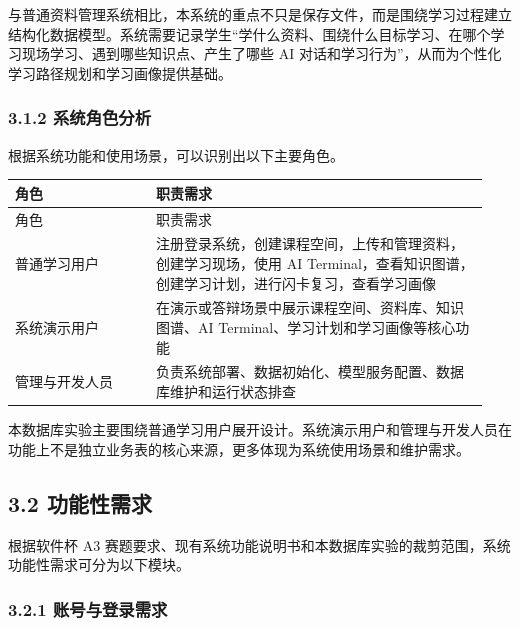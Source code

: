 \documentclass[10pt,a4paper,fontset=none]{ctexart}
\begin{document}
与普通资料管理系统相比，本系统的重点不只是保存文件，而是围绕学习过程建立结构化数据模型。系统需要记录学生“学什么资料、围绕什么目标学习、在哪个学习现场学习、遇到哪些知识点、产生了哪些 AI 对话和学习行为”，从而为个性化学习路径规划和学习画像提供基础。\par

\subsubsection*{3.1.2 系统角色分析}

根据系统功能和使用场景，可以识别出以下主要角色。\par

\begingroup\scriptsize
\renewcommand{\arraystretch}{1.18}
\setlength{\LTleft}{0pt}
\setlength{\LTright}{0pt}
\begin{longtable}{>{\raggedright\arraybackslash}p{0.28\linewidth}>{\raggedright\arraybackslash}p{0.66\linewidth}}
\toprule
角色 & 职责需求 \\
\midrule
\endfirsthead
\toprule
角色 & 职责需求 \\
\midrule
\endhead
普通学习用户 & 注册登录系统，创建课程空间，上传和管理资料，创建学习现场，使用 AI Terminal，查看知识图谱，创建学习计划，进行闪卡复习，查看学习画像 \\
系统演示用户 & 在演示或答辩场景中展示课程空间、资料库、知识图谱、AI Terminal、学习计划和学习画像等核心功能 \\
管理与开发人员 & 负责系统部署、数据初始化、模型服务配置、数据库维护和运行状态排查 \\
\bottomrule
\end{longtable}
\endgroup


本数据库实验主要围绕普通学习用户展开设计。系统演示用户和管理与开发人员在功能上不是独立业务表的核心来源，更多体现为系统使用场景和维护需求。\par

\subsection*{3.2 功能性需求}

根据软件杯 A3 赛题要求、现有系统功能说明书和本数据库实验的裁剪范围，系统功能性需求可分为以下模块。\par

\subsubsection*{3.2.1 账号与登录需求}
\end{document}
